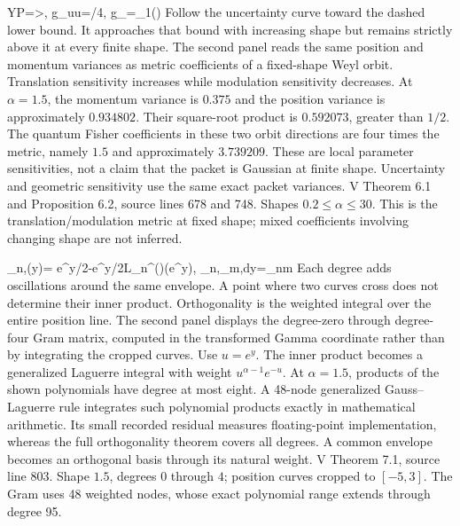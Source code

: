 {\Delta Y\Delta P=>,
 \qquad g_{uu}=\alpha/4,\qquad
 g_{\eta\eta}=\psi_1(\alpha)}
{Follow the uncertainty curve toward the dashed lower bound. It approaches
that bound with increasing shape but remains strictly above it at every
finite shape. The second panel reads the same position and momentum variances
as metric coefficients of a fixed-shape Weyl orbit. Translation sensitivity
increases while modulation sensitivity decreases.}
{At $\alpha=1.5$, the momentum variance is $0.375$ and the position
variance is approximately $0.934802$. Their square-root product is
$0.592073$, greater than $1/2$. The quantum Fisher coefficients in these
two orbit directions are four times the metric, namely $1.5$ and
approximately $3.739209$. These are local parameter sensitivities, not a
claim that the packet is Gaussian at finite shape.}
{Uncertainty and geometric sensitivity use the same exact packet variances.}
{V Theorem 6.1 and Proposition 6.2, source lines 678 and 748.
Shapes $0.2\leq\alpha\leq30$. This is the translation/modulation metric
at fixed shape; mixed coefficients involving changing shape are not inferred.}

{\Lambda_{n,\alpha}(y)=
 e^{\alpha y/2-e^y/2}L_n^{()}(e^y),\qquad
 \int\Lambda_{n,\alpha}\Lambda_{m,\alpha}dy=\delta_{nm}}
{Each degree adds oscillations around the same envelope. A point where two
curves cross does not determine their inner product. Orthogonality is the
weighted integral over the entire position line. The second panel displays
the degree-zero through degree-four Gram matrix, computed in the transformed
Gamma coordinate rather than by integrating the cropped curves.}
{Use $u=e^y$. The inner product becomes a generalized Laguerre integral
with weight $u^{\alpha-1}e^{-u}$. At $\alpha=1.5$, products of the shown
polynomials have degree at most eight. A 48-node generalized Gauss--Laguerre
rule integrates such polynomial products exactly in mathematical arithmetic.
Its small recorded residual measures floating-point implementation, whereas
the full orthogonality theorem covers all degrees.}
{A common envelope becomes an orthogonal basis through its natural weight.}
{V Theorem 7.1, source line 803. Shape $1.5$, degrees $0$ through $4$;
position curves cropped to $[-5,3]$. The Gram uses 48 weighted nodes,
whose exact polynomial range extends through degree 95.}

